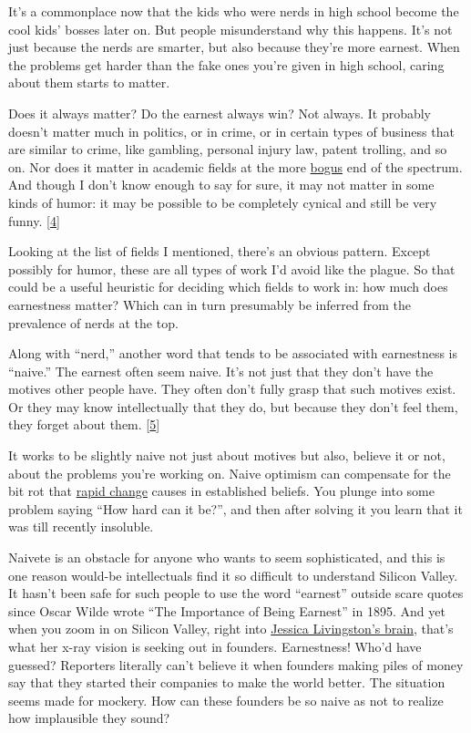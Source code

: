 It's a commonplace now that the kids who were nerds in high school
become the cool kids' bosses later on. But people misunderstand why this
happens. It's not just because the nerds are smarter, but also because
they're more earnest. When the problems get harder than the fake ones
you're given in high school, caring about them starts to matter.

Does it always matter? Do the earnest always win? Not always. It
probably doesn't matter much in politics, or in crime, or in certain
types of business that are similar to crime, like gambling, personal
injury law, patent trolling, and so on. Nor does it matter in academic
fields at the more
\href{https://scholar.google.com/scholar?hl=en&as_sdt=0\%2C5&q=hermeneutic+dialectics+hegemonic+phenomenology+intersectionality}{bogus}
end of the spectrum. And though I don't know enough to say for sure, it
may not matter in some kinds of humor: it may be possible to be
completely cynical and still be very funny. {[}\hyperref[f4n]{4}{]}

Looking at the list of fields I mentioned, there's an obvious pattern.
Except possibly for humor, these are all types of work I'd avoid like
the plague. So that could be a useful heuristic for deciding which
fields to work in: how much does earnestness matter? Which can in turn
presumably be inferred from the prevalence of nerds at the top.

Along with ``nerd,'' another word that tends to be associated with
earnestness is ``naive.'' The earnest often seem naive. It's not just
that they don't have the motives other people have. They often don't
fully grasp that such motives exist. Or they may know intellectually
that they do, but because they don't feel them, they forget about them.
{[}\hyperref[f5n]{5}{]}

It works to be slightly naive not just about motives but also, believe
it or not, about the problems you're working on. Naive optimism can
compensate for the bit rot that \href{ecw.html}{rapid change} causes in
established beliefs. You plunge into some problem saying ``How hard can
it be?'', and then after solving it you learn that it was till recently
insoluble.

Naivete is an obstacle for anyone who wants to seem sophisticated, and
this is one reason would-be intellectuals find it so difficult to
understand Silicon Valley. It hasn't been safe for such people to use
the word ``earnest'' outside scare quotes since Oscar Wilde wrote ``The
Importance of Being Earnest'' in 1895. And yet when you zoom in on
Silicon Valley, right into \href{jessica.html}{Jessica Livingston's
brain}, that's what her x-ray vision is seeking out in founders.
Earnestness! Who'd have guessed? Reporters literally can't believe it
when founders making piles of money say that they started their
companies to make the world better. The situation seems made for
mockery. How can these founders be so naive as not to realize how
implausible they sound?

